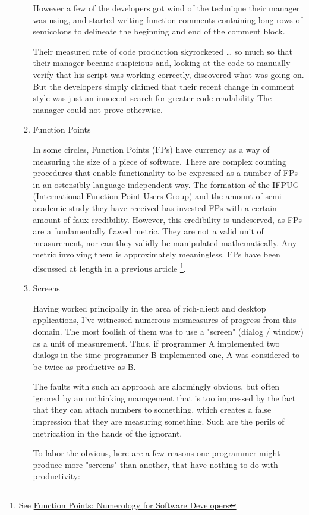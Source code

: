 \documentclass{article}
\begin{document}
\begin{enumerate}
\begin{enumerate}
However a few of the developers got wind of the technique their manager
was using, and started writing function comments containing long rows of
semicolons to delineate the beginning and end of the comment block.

Their measured rate of code production skyrocketed \ldots{} so much so that
their manager became suspicious and, looking at the code to manually
verify that his script was working correctly, discovered what was going
on. But the developers simply claimed that their recent change in
comment style was just an innocent search for greater code readability
The manager could not prove otherwise.

\item Function Points
\label{sec:orgheadline168}

In some circles, Function Points (FPs) have currency as a way of
measuring the size of a piece of software. There are complex counting
procedures that enable functionality to be expressed as a number of FPs
in an ostensibly language-independent way. The formation of the IFPUG
(International Function Point Users Group) and the amount of
semi-academic study they have received has invested FPs with a certain
amount of faux credibility. However, this credibility is undeserved, as
FPs are a fundamentally flawed metric. They are not a valid unit of
measurement, nor can they validly be manipulated mathematically. Any
metric involving them is approximately meaningless. FPs have been
discussed at length in a previous article \footnote{See \hyperref[sec:orgheadline167]{Function Points: Numerology for Software
Developers}}.

\item Screens
\label{sec:orgheadline169}

Having worked principally in the area of rich-client and desktop
applications, I've witnessed numerous mismeasures of progress from this
domain. The most foolish of them was to use a "screen" (dialog / window)
as a unit of measurement. Thus, if programmer A implemented two dialogs
in the time programmer B implemented one, A was considered to be twice
as productive as B.

The faults with such an approach are alarmingly obvious, but often
ignored by an unthinking management that is too impressed by the fact
that they can attach numbers to something, which creates a false
impression that they are measuring something. Such are the perils of
metrication in the hands of the ignorant.

To labor the obvious, here are a few reasons one programmer might
produce more "screens" than another, that have nothing to do with
productivity:


\end{enumerate}
\end{enumerate}
\end{document}
